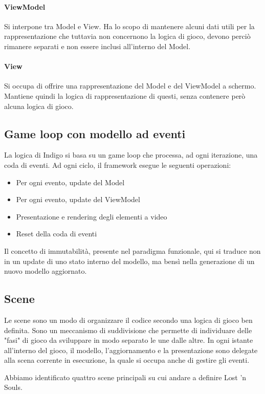 \paragraph{ViewModel}
Si interpone tra Model e View. Ha lo scopo di mantenere alcuni dati utili per la rappresentazione che tuttavia non concernono la logica di gioco, devono perciò rimanere separati e non essere inclusi all'interno del Model.

\paragraph{View}
Si occupa di offrire una rappresentazione del Model e del ViewModel a schermo. Mantiene quindi la logica di rappresentazione di questi, senza contenere però alcuna logica di gioco.

\subsection{Game loop con modello ad eventi}
La logica di Indigo si basa su un game loop che processa, ad ogni iterazione, una coda di eventi. 
Ad ogni ciclo, il framework esegue le seguenti operazioni:
\begin{itemize}
    \item Per ogni evento, update del Model
    \item Per ogni evento, update del ViewModel
    \item Presentazione e rendering degli elementi a video
    \item Reset della coda di eventi
\end{itemize}

Il concetto di immutabilità, presente nel paradigma funzionale, qui si traduce non in un update di uno stato interno del modello, ma bensì nella generazione di un nuovo modello aggiornato. 

\subsection{Scene}
Le scene sono un modo di organizzare il codice secondo una logica di gioco ben definita. Sono un meccanismo di suddivisione che permette di individuare delle "fasi" di gioco da sviluppare in modo separato le une dalle altre.
In ogni istante all'interno del gioco, il modello, l'aggiornamento e la presentazione sono delegate alla scena corrente in esecuzione, la quale si occupa anche di gestire gli eventi. 

Abbiamo identificato quattro scene principali su cui andare a definire Lost 'n Souls. 

